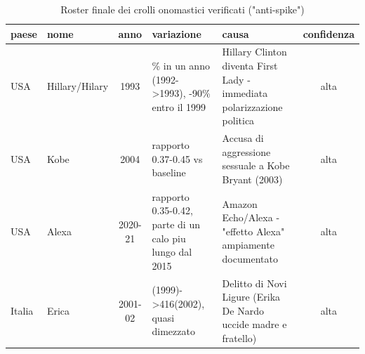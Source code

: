 \begin{table}[t]
\centering
\footnotesize
\caption{Roster finale dei crolli onomastici verificati ("anti-spike")}
\label{tab:negative_spikes}
\begin{tabular}{l >{\raggedright\arraybackslash}p{2cm} c >{\raggedright\arraybackslash}p{3cm} >{\raggedright\arraybackslash}p{6cm} c}
\toprule
\textbf{paese} & \textbf{nome} & \textbf{anno} & \textbf{variazione} & \textbf{causa} & \textbf{confidenza} \\
\midrule
USA & Hillary/Hilary & 1993 & -58\% in un anno (1992->1993), -90\% entro il 1999 & Hillary Clinton diventa First Lady - immediata polarizzazione politica & alta \\
USA & Kobe & 2004 & rapporto 0.37-0.45 vs baseline & Accusa di aggressione sessuale a Kobe Bryant (2003) & alta \\
USA & Alexa & 2020-21 & rapporto 0.35-0.42, parte di un calo piu lungo dal 2015 & Amazon Echo/Alexa - "effetto Alexa" ampiamente documentato & alta \\
Italia & Erica & 2001-02 & 863(1999)->416(2002), quasi dimezzato & Delitto di Novi Ligure (Erika De Nardo uccide madre e fratello) & alta \\
\bottomrule
\end{tabular}
\end{table}
